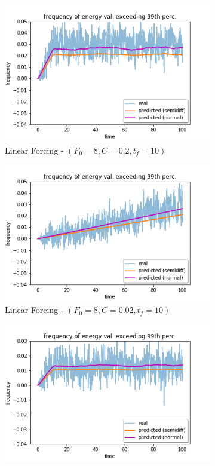 \documentclass{article}
\begin{document}
\begin{figure}[!ht]
\begin{subfigure}[b]{0.48\textwidth}
		\includegraphics[width=1\linewidth]{fig/pred_energy_exceed_099q_L_02_10.png}
		\caption{Linear Forcing - $(F_0=8, C=0.2, t_f=10)$}
		\label{fig:pred_energy_exceed_099q_L_02_10_comp}
	\end{subfigure}%
	\begin{subfigure}[b]{0.48\textwidth}
		\includegraphics[width=1\linewidth]{fig/pred_energy_exceed_099q_L_002_100.png}
		\caption{Linear Forcing - $(F_0=8, C=0.02, t_f=10)$}
		\label{fig:pred_energy_exceed_099q_L_002_100_comp}
	\end{subfigure}
	\begin{subfigure}[b]{0.48\textwidth}
		\includegraphics[width=1\linewidth]{fig/pred_energy_exceed_099q_L_01_10.png}

\end{subfigure}
\end{figure}
\end{document}
